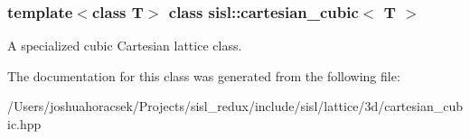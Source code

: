 \subsubsection*{template$<$class T$>$\newline
class sisl\+::cartesian\+\_\+cubic$<$ T $>$}

A specialized cubic Cartesian lattice class. 

The documentation for this class was generated from the following file\+:\begin{DoxyCompactItemize}
\item 
/\+Users/joshuahoracsek/\+Projects/sisl\+\_\+redux/include/sisl/lattice/3d/cartesian\+\_\+cubic.\+hpp\end{DoxyCompactItemize}
